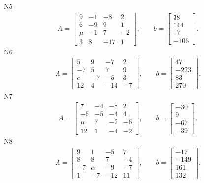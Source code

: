 \documentclass[11pt]{report}
\begin{document}
N5
\begin{align*}
 A = \left[\begin{matrix}9 & -1 & -8 & 2\\6 & -9 & 9 & 1\\\mu & -1 & 7 & -2\\3 & 8 & -17 & 1\end{matrix}\right],
\qquad b = \left[\begin{matrix}38\\144\\17\\-106\end{matrix}\right]. 
 \end{align*}
N6
\begin{align*}
 A = \left[\begin{matrix}5 & 9 & -7 & 2\\-7 & 5 & 7 & 9\\c & -7 & -5 & 3\\12 & 4 & -14 & -7\end{matrix}\right],
\qquad b = \left[\begin{matrix}47\\-223\\83\\270\end{matrix}\right]. 
 \end{align*}
N7
\begin{align*}
 A = \left[\begin{matrix}7 & -4 & -8 & 2\\-5 & -5 & -4 & 4\\\mu & 7 & -2 & -6\\12 & 1 & -4 & -2\end{matrix}\right],
\qquad b = \left[\begin{matrix}-30\\9\\-67\\-39\end{matrix}\right]. 
 \end{align*}
N8
\begin{align*}
 A = \left[\begin{matrix}9 & 1 & -5 & 7\\8 & 8 & 7 & -4\\-7 & \alpha & -9 & -7\\1 & -7 & -12 & 11\end{matrix}\right],
\qquad b = \left[\begin{matrix}-17\\-149\\161\\132\end{matrix}\right]. 
 \end{align*}
\end{document}
